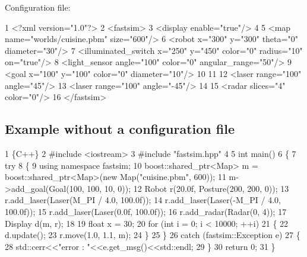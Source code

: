 Configuration file\+: 
\begin{DoxyCode}
1 <?\textcolor{keyword}{xml} \textcolor{keyword}{version}=\textcolor{stringliteral}{"1.0"}?>
2 <\textcolor{keywordtype}{fastsim}>
3   <\textcolor{keywordtype}{display} \textcolor{keyword}{enable}=\textcolor{stringliteral}{"true"}/>
4   
5   <\textcolor{keywordtype}{map} \textcolor{keyword}{name}=\textcolor{stringliteral}{"worlds/cuisine.pbm"} \textcolor{keyword}{size}=\textcolor{stringliteral}{"600"}/>
6   <\textcolor{keywordtype}{robot} \textcolor{keyword}{x}=\textcolor{stringliteral}{"300"} \textcolor{keyword}{y}=\textcolor{stringliteral}{"300"} \textcolor{keyword}{theta}=\textcolor{stringliteral}{"0"} \textcolor{keyword}{diameter}=\textcolor{stringliteral}{"30"}/>
7   <\textcolor{keywordtype}{illuminated\_switch} \textcolor{keyword}{x}=\textcolor{stringliteral}{"250"} \textcolor{keyword}{y}=\textcolor{stringliteral}{"450"} \textcolor{keyword}{color}=\textcolor{stringliteral}{"0"} \textcolor{keyword}{radius}=\textcolor{stringliteral}{"10"} \textcolor{keyword}{on}=\textcolor{stringliteral}{"true"}/>
8   <\textcolor{keywordtype}{light\_sensor} \textcolor{keyword}{angle}=\textcolor{stringliteral}{"100"} \textcolor{keyword}{color}=\textcolor{stringliteral}{"0"} \textcolor{keyword}{angular\_range}=\textcolor{stringliteral}{"50"}/>
9   <\textcolor{keywordtype}{goal} \textcolor{keyword}{x}=\textcolor{stringliteral}{"100"} \textcolor{keyword}{y}=\textcolor{stringliteral}{"100"} \textcolor{keyword}{color}=\textcolor{stringliteral}{"0"} \textcolor{keyword}{diameter}=\textcolor{stringliteral}{"10"}/>
10 
11   
12   <\textcolor{keywordtype}{laser} \textcolor{keyword}{range}=\textcolor{stringliteral}{"100"} \textcolor{keyword}{angle}=\textcolor{stringliteral}{"45"}/>
13   <\textcolor{keywordtype}{laser} \textcolor{keyword}{range}=\textcolor{stringliteral}{"100"} \textcolor{keyword}{angle}=\textcolor{stringliteral}{"-45"}/>
14   
15   <\textcolor{keywordtype}{radar} \textcolor{keyword}{slices}=\textcolor{stringliteral}{"4"} \textcolor{keyword}{color}=\textcolor{stringliteral}{"0"}/>
16 </\textcolor{keywordtype}{fastsim}>
\end{DoxyCode}


\subsection*{Example without a configuration file }


\begin{DoxyCode}
1 \{C++\}
2 #include <iostream>
3 #include "fastsim.hpp"
4 
5 int main()
6 \{
7   try
8     \{
9       using namespace fastsim; 
10       boost::shared\_ptr<Map> m = boost::shared\_ptr<Map>(new Map("cuisine.pbm", 600));
11       m->add\_goal(Goal(100, 100, 10, 0));
12       Robot r(20.0f, Posture(200, 200, 0));
13       r.add\_laser(Laser(M\_PI / 4.0, 100.0f));
14       r.add\_laser(Laser(-M\_PI / 4.0, 100.0f));
15       r.add\_laser(Laser(0.0f, 100.0f));
16       r.add\_radar(Radar(0, 4));
17       Display d(m, r);
18 
19       float x = 30;
20       for (int i = 0; i < 10000; ++i)
21   \{
22     d.update();
23     r.move(1.0, 1.1, m);
24   \}
25     \}
26   catch (fastsim::Exception e)
27     \{
28       std::cerr<<"error : "<<e.get\_msg()<<std::endl;
29     \}
30   return 0;
31 \}
\end{DoxyCode}
 